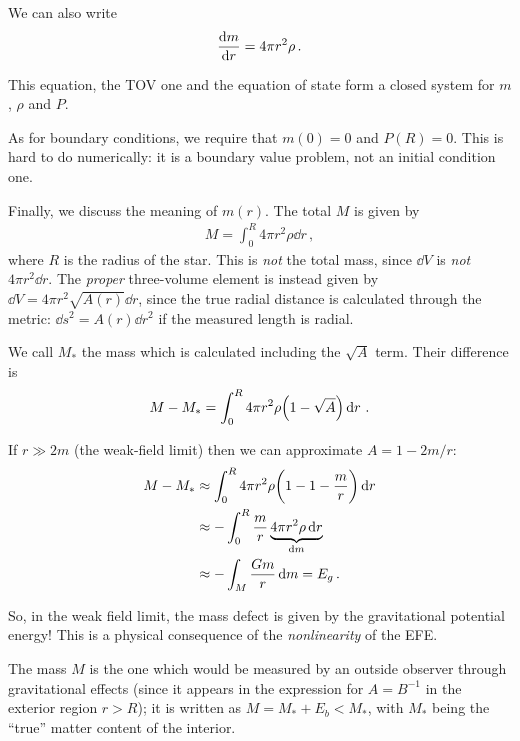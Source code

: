 \documentclass[main.tex]{subfiles}
\begin{document}
We can also write 
%
\begin{align}
\dv{m}{r} = 4 \pi r^2 \rho 
\,.
\end{align}

This equation, the TOV one and the equation of state form a closed system for \(m\), \(\rho \) and \(P\). 

As for boundary conditions, we require that \(m(0) = 0\) and \(P(R) = 0\). 
This is hard to do numerically: it is a boundary value problem, not an initial condition one. 

Finally, we discuss the meaning of \(m(r)\). 
The total \(M\) is given by 
%
\begin{align}
M = \int_{0}^{R} 4 \pi r^2 \rho \dd{r}
\,,
\end{align}
%
where \(R\) is the radius of the star. This is \emph{not} the total mass, since \(\dd{V}\) is \emph{not} \(4 \pi r^2 \dd{r}\). 
The \emph{proper} three-volume element is instead given by \(\dd{V} = 4 \pi r^2 \sqrt{A(r)} \dd{r}\), since the true radial distance is calculated through the metric: \(\dd{s^2} = A(r) \dd{r^2}\) if the measured length is radial. 

We call \(M_*\) the mass which is calculated including the \(\sqrt{A}\) term. Their difference is 
%
\begin{align}
M - M_* = \int_{0}^{R} 4 \pi r^2 \rho \qty(1 - \sqrt{A}) \dd{r}
\,.
\end{align}
 
If \(r \gg 2m\) (the weak-field limit) then we can approximate \(A = 1 - 2m /r\):
%
\begin{align}
M - M_* &\approx \int_{0}^{R} 4 \pi r^2 \rho \qty(1 - 1 - \frac{m}{r}) \dd{r}    \\
&\approx - \int_{0}^{R} \frac{m}{r} \underbrace{4 \pi r^2 \rho \dd{r}}_{ \dd{m}}    \\
&\approx - \int_{M} \frac{Gm}{r} \dd{m} = E_g
\,.
\end{align}

So, in the weak field limit, the mass defect is given by the gravitational potential energy! 
This is a physical consequence of the \emph{nonlinearity} of the EFE. 

The mass \(M\) is the one which would be measured by an outside observer through gravitational effects (since it appears in the expression for \(A = B^{-1}\) in the exterior region \(r > R\)); it is written as \(M = M_* + E_b < M_*\), with \(M_*\) being the ``true'' matter content of the interior. 
\end{document}
